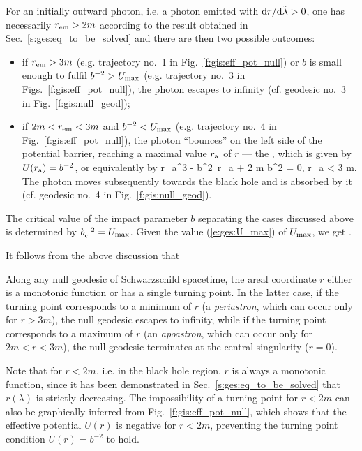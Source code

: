 For an initially outward photon, i.e. a photon emitted with ${\mathrm{d} r}/{\mathrm{d}\tilde{\lambda}} > 0$,
one has necessarily $r_{\rm em}>2m$ according to the result obtained in Sec.~\ref{s:ges:eq_to_be_solved}
and there are then two possible outcomes:

\begin{itemize}
\item if $r_{\rm em} > 3 m$ (e.g. trajectory
no.~1 in Fig.~\ref{f:gis:eff_pot_null}) or
$b$ is small enough to fulfil $b^{-2} > U_{\rm max}$ (e.g. trajectory
no.~3 in Figs.~\ref{f:gis:eff_pot_null}), the photon escapes to infinity
(cf. geodesic no.~3 in Fig.~\ref{f:gis:null_geod});
\item if $2m < r_{\rm em} < 3 m$ and $b^{-2} < U_{\rm max}$ (e.g. trajectory
no.~4 in Fig.~\ref{f:gis:eff_pot_null}), the photon ``bounces'' on the left
side of the potential barrier, reaching a maximal value $r_{\rm a}$ of $r$
--- the ,
which is given by  $U(r_{\rm a}) = b^{-2}$, or equivalently by
\be \label{e:ges:r_apo_null}
   r_{\rm a}^3 - b^2\, r_{\rm a} + 2 m b^2 = 0, \quad r_{\rm a} < 3 m.
\ee
The photon moves subsequently towards the black hole and
is absorbed by it (cf. geodesic no.~4 in Fig.~\ref{f:gis:null_geod}).
\end{itemize}

The critical value of the impact parameter $b$ separating the cases discussed
above is determined by $b_{\rm c}^{-2} = U_{\rm max}$.
Given the value (\ref{e:ges:U_max}) of $U_{\rm max}$, we get
\be \label{e:ges:b_crit}
    .
\ee

It follows from the above discussion that
\begin{greybox}
Along any null geodesic of Schwarzschild spacetime, the areal coordinate $r$
either is a monotonic function or has a single turning point. In the latter case,
if the turning point corresponds to a minimum of $r$ (a \emph{periastron}, which can occur
only for $r>3m$), the null geodesic escapes to infinity, while if the turning
point corresponds to a maximum of $r$ (an \emph{apoastron}, which can occur only for $2m<r<3m$), the
null geodesic terminates at the central singularity ($r=0$).
\end{greybox}
Note that for $r<2m$, i.e. in the black hole region, $r$
is always a monotonic function, since it has been demonstrated in
Sec.~\ref{s:ges:eq_to_be_solved} that $r(\lambda)$ is strictly
decreasing. The impossibility of a turning point for $r<2m$ can also be
graphically inferred from Fig.~\ref{f:gis:eff_pot_null}, which shows
that the effective potential $U(r)$ is negative for $r<2m$,
preventing the turning point condition $U(r) = b^{-2}$ to hold.


